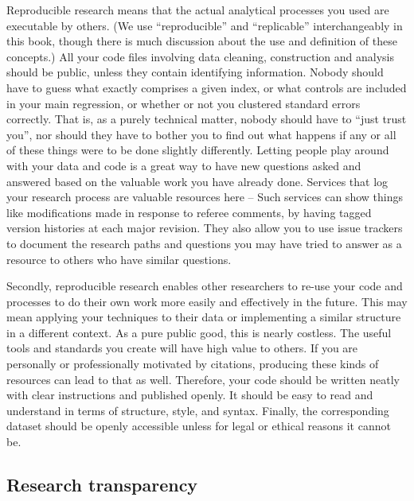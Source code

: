 Reproducible research means that the actual analytical processes you used are executable by others.\cite{dafoe2014science}
(We use ``reproducible'' and ``replicable'' interchangeably in this book,
though there is much discussion about the use and definition of these concepts.)
All your code files involving data cleaning, construction and analysis
should be public, unless they contain identifying information.
Nobody should have to guess what exactly comprises a given index,
or what controls are included in your main regression,
or whether or not you clustered standard errors correctly.
That is, as a purely technical matter, nobody should have to ``just trust you'',
nor should they have to bother you to find out what happens
if any or all of these things were to be done slightly differently.\cite{simmons2011false,simonsohn2015specification,wicherts2016degrees}
Letting people play around with your data and code
is a great way to have new questions asked and answered
based on the valuable work you have already done.
Services that log your research process are valuable resources here --
Such services can show things like modifications made in response to referee comments,
by having tagged version histories at each major revision.
They also allow you to use issue trackers
to document the research paths and questions you may have tried to answer
as a resource to others who have similar questions.

Secondly, reproducible research
enables other researchers to re-use your code and processes
to do their own work more easily and effectively in the future.
This may mean applying your techniques to their data
or implementing a similar structure in a different context.
As a pure public good, this is nearly costless.
The useful tools and standards you create will have high value to others.
If you are personally or professionally motivated by citations,
producing these kinds of resources can lead to that as well.
Therefore, your code should be written neatly with clear instructions and published openly.
It should be easy to read and understand in terms of structure, style, and syntax.
Finally, the corresponding dataset should be openly accessible
unless for legal or ethical reasons it cannot be.

\subsection{Research transparency}

